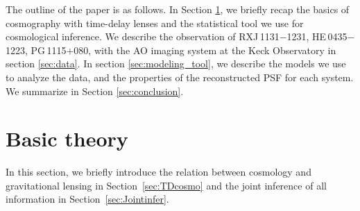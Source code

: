 \documentclass[useAMS,usenatbib]{mnras}
\newcommand\rxj{RXJ\,1131$-$1231}
\newcommand\he{HE\,0435$-$1223}
\newcommand\pg{PG\,1115$+$080}
\newcommand{\sref}[1]{Section~\ref{#1}}
\begin{document}
The outline of the paper is as follows. In Section \ref{sec:basic}, we briefly recap the basics of cosmography with time-delay lenses and the statistical tool we use for cosmological inference. We describe the observation of \rxj, \he, \pg, with the AO imaging system at the Keck Observatory in section \ref{sec:data}. In section \ref{sec:modeling_tool}, we describe the models we use to analyze the data, and the properties of the reconstructed PSF for each system. We summarize in Section \ref{sec:conclusion}.



\section{Basic theory}
\label{sec:basic}
In this section, we briefly introduce the relation between cosmology and gravitational lensing in \sref{sec:TDcosmo} and the joint inference of all information in \sref{sec:Jointinfer}.
\end{document}
